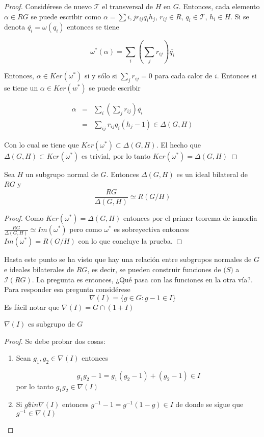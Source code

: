 \begin{proof}
Considérese de nuevo $\mathcal{T}$ el transversal de $H$ en $G$. Entonces, cada elemento $\alpha \in RG$ se puede escribir como $ \alpha = \sum{i,j} r_{ij} q_ih_j$, $r_{ij} \in R$, $q_i \in \mathcal{T}$, $h_i \in H$. Si se denota $\overline{q_i} = \omega(q_i)$ entonces se tiene

\[\omega^*(\alpha) = \sum_i\left(\sum_jr_{ij}\right)\overline{q_i} \]

Entonces, $\alpha \in Ker(\omega^*)$ si y sólo si $ \sum_jr_{ij} = 0 $ para cada calor de $i$. Entonces si se tiene un $\alpha \in Ker(w^*)$ se puede escribir

\begin{eqnarray}
\alpha &=& \sum_i\left(\sum_jr_{ij}\right)\overline{q_i} \\
 &=& \sum_{ij}r_{ij}q_i(h_j-1) \in \Delta(G,H)  
\end{eqnarray}

Con lo cual se tiene que $Ker(\omega^*) \subset \Delta(G,H)$. El hecho que $\Delta(G,H) \subset Ker(\omega^*)$ es trivial, por lo tanto $Ker(\omega^*) = \Delta(G,H)$ \qedhere
\end{proof}

\begin{corolario}
Sea $H$ un subgrupo normal de $G$. Entonces $\Delta(G,H)$ es un ideal bilateral de $RG$ y
\[\frac{RG}{\Delta(G,H)} \simeq R(G/H)\]
\end{corolario}

\begin{proof}
Como $Ker(\omega^*) = \Delta(G,H)$ entonces por el primer teorema de ismorfia $ \frac{RG}{\Delta(G,H)} \simeq Im(\omega^*) $ pero como $\omega^*$ es sobreyectiva entonces $Im(\omega^*) = R(G/H)$ con lo que concluye la prueba. \qedhere
\end{proof}


Hasta este punto se ha visto que hay una relación entre subgrupos normales de $G$ e ideales bilaterales de $RG$, es decir, se pueden construir funciones de $\mathcal(S) $ a $\mathcal{I}(RG)$. La pregunta es entonces, ¿Qué pasa con las funciones en la otra vía?. Para responder esa pregunta considérese 
$$ \nabla(I) = \{ g \in G \colon  g-1 \in I\}$$
Es fácil notar que $\nabla(I) = G \cap (1+I)$

\begin{lema}
$\nabla(I)$ es subgrupo de $G$
\end{lema}
\begin{proof}
Se debe probar dos cosas:
\begin{enumerate}
\item Sean $g_1,g_2 \in \nabla(I)$ entonces 

\[g_1g_2 -1 = g_1(g_2-1) + (g_2-1) \in I \]
por lo tanto $g_1g_2 \in \nabla(I)$

\item Si $g \$in \nabla(I)$ entonces $g^{-1} -1 = g^{-1}(1-g) \in I$ de donde se sigue que $g^{-1} \in \nabla(I)$ \qedhere
\end{enumerate}
\end{proof}

